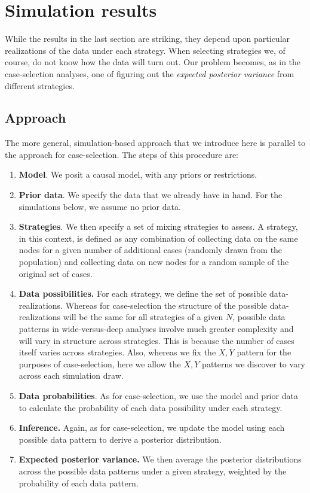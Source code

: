 \documentclass[
  12pt,
]{book}
\providecommand{\tightlist}{%
  \setlength{\itemsep}{0pt}\setlength{\parskip}{0pt}}
\begin{document}
\hypertarget{simulation-results-1}{%
\section{Simulation results}\label{simulation-results-1}}

While the results in the last section are striking, they depend upon particular realizations of the data under each strategy. When selecting strategies we, of course, do not know how the data will turn out. Our problem becomes, as in the case-selection analyses, one of figuring out the \emph{expected posterior variance} from different strategies.

\hypertarget{approach}{%
\subsection{Approach}\label{approach}}

The more general, simulation-based approach that we introduce here is parallel to the approach for case-selection. The steps of this procedure are:

\begin{enumerate}
\def\labelenumi{\arabic{enumi}.}
\tightlist
\item
  \textbf{Model}. We posit a causal model, with any priors or restrictions.
\item
  \textbf{Prior data}. We specify the data that we already have in hand. For the simulations below, we assume no prior data.
\item
  \textbf{Strategies}. We then specify a set of mixing strategies to assess. A strategy, in this context, is defined as any combination of collecting data on the same nodes for a given number of additional cases (randomly drawn from the population) and collecting data on new nodes for a random sample of the original set of cases.
\item
  \textbf{Data possibilities.} For each strategy, we define the set of possible data-realizations. Whereas for case-selection the structure of the possible data-realizations will be the same for all strategies of a given \(N\), possible data patterns in wide-versus-deep analyses involve much greater complexity and will vary in structure across strategies. This is because the number of cases itself varies across strategies. Also, whereas we fix the \(X,Y\) pattern for the purposes of case-selection, here we allow the \(X,Y\) patterns we discover to vary across each simulation draw.
\item
  \textbf{Data probabilities}. As for case-selection, we use the model and prior data to calculate the probability of each data possibility under each strategy.
\item
  \textbf{Inference.} Again, as for case-selection, we update the model using each possible data pattern to derive a posterior distribution.
\item
  \textbf{Expected posterior variance.} We then average the posterior distributions across the possible data patterns under a given strategy, weighted by the probability of each data pattern.
\end{enumerate}
\end{document}
